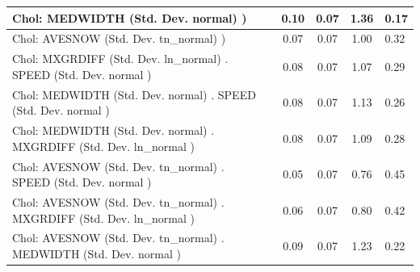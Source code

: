 \begin{table}
\begin{center}
\begin{tabular}{|l|l|c|c|c|l|}
			 Chol: MEDWIDTH (Std. Dev. normal) ) &  & 0.10 & 0.07 & 1.36 & 0.17 \\
			\hline
			 Chol: AVESNOW (Std. Dev. tn_normal) ) &  & 0.07 & 0.07 & 1.00 & 0.32 \\
			\hline
			 Chol: MXGRDIFF (Std. Dev. ln_normal) . SPEED (Std. Dev.   normal ) &  & 0.08 & 0.07 & 1.07 & 0.29 \\
			\hline
			 Chol: MEDWIDTH (Std. Dev. normal) . SPEED (Std. Dev.   normal ) &  & 0.08 & 0.07 & 1.13 & 0.26 \\
			\hline
			 Chol: MEDWIDTH (Std. Dev. normal) . MXGRDIFF (Std. Dev.   ln_normal ) &  & 0.08 & 0.07 & 1.09 & 0.28 \\
			\hline
			 Chol: AVESNOW (Std. Dev. tn_normal) . SPEED (Std. Dev.   normal ) &  & 0.05 & 0.07 & 0.76 & 0.45 \\
			\hline
			 Chol: AVESNOW (Std. Dev. tn_normal) . MXGRDIFF (Std. Dev.   ln_normal ) &  & 0.06 & 0.07 & 0.80 & 0.42 \\
			\hline
			 Chol: AVESNOW (Std. Dev. tn_normal) . MEDWIDTH (Std. Dev.   normal ) &  & 0.09 & 0.07 & 1.23 & 0.22 \\
			\hline
		\end{tabular}
	\end{center}
\end{table}